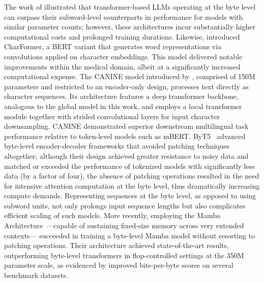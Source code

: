 The work of \cite{Choe2019BridgingTG} illustrated that transformer-based LLMs operating at the byte level can surpass their subword-level counterparts in performance for models with similar parameter counts; however, these architectures incur substantially higher computational costs and prolonged training durations. Likewise, \cite{el2020characterbert} introduced CharFormer, a BERT variant that generates word representations via convolutions applied on character embeddings. This model delivered notable improvements within the medical domain, albeit at a significantly increased computational expense. The CANINE model introduced by \cite{clark2022canine}, comprised of 150M parameters and restricted to an encoder-only design, processes text directly as character sequences. Its architecture features a deep transformer backbone, analogous to the global model in this work, and employs a local transformer module together with strided convolutional layers for input character downsampling. CANINE demonstrated superior downstream multilingual task performance relative to token-level models such as mBERT. ByT5~\citep{xue2022byt5} advanced byte-level encoder-decoder frameworks that avoided patching techniques altogether; although their design achieved greater resistance to noisy data and matched or exceeded the performance of tokenized models with significantly less data (by a factor of four), the absence of patching operations resulted in the need for intensive attention computation at the byte level, thus dramatically increasing compute demands. Representing sequences at the byte level, as opposed to using subword units, not only prolongs input sequence lengths but also complicates efficient scaling of such models. More recently, employing the Mamba Architecture~\citep{gu2023mamba}—capable of sustaining fixed-size memory across very extended contexts—\cite{wang2024mambabyte} succeeded in training a byte-level Mamba model without resorting to patching operations. Their architecture achieved state-of-the-art results, outperforming byte-level transformers in flop-controlled settings at the 350M parameter scale, as evidenced by improved bits-per-byte scores on several benchmark datasets.

